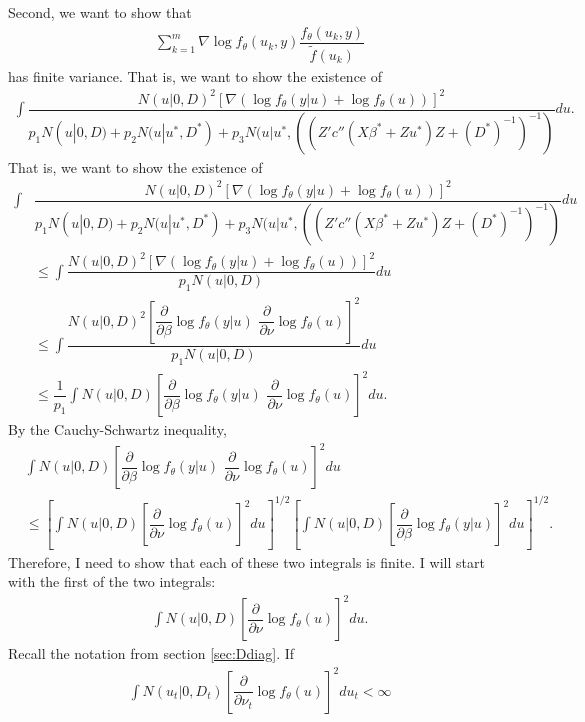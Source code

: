 \documentclass{article}
\begin{document}
Second, we want to show that
\begin{align}
\sum_{k=1}^m \nabla \log f_\theta (u_k,y) \dfrac{f_\theta(u_k,y)}{\tilde{f}(u_k)}
\end{align}
 has finite variance. That is, we want to show the existence of
\begin{align}
\int \dfrac{N(u|0,D)^2 \left[\nabla \left(\log f_\theta(y|u)+\log f_\theta (u) \right) \right]^2}{p_1 N(u|0,D)+p_2 N(u|u^*, D^*) + p_3 N(u|u^*, ((Z'  c''(X \beta^*+Zu^*) Z +(D^*)^{-1}   )^{-1})} du.
\end{align}
That is, we want to show the existence of
\begin{align}
\int &\dfrac{N(u|0,D)^2 \left[\nabla \left(\log f_\theta(y|u)+\log f_\theta (u) \right) \right]^2}{p_1 N(u|0,D)+p_2 N(u|u^*, D^*) + p_3 N(u|u^*, ((Z'  c''(X \beta^*+Zu^*) Z +(D^*)^{-1}   )^{-1})} du \\
&\leq \int  \dfrac{N(u|0,D)^2 \left[\nabla \left(\log f_\theta(y|u) + \log f_\theta (u) \right) \right]^2}{p_1 N(u|0,D)} du  \\
&\leq  \int \dfrac{N(u|0,D)^2 \left[ \dfrac{\partial}{\partial \beta} \log f_\theta(y|u) \, \, \dfrac{\partial}{\partial \nu} \log f_\theta (u)  \right]^2}{p_1 N(u|0,D)} du  \\
&\leq \dfrac{1}{p_1}  \int N(u|0,D) \left[ \dfrac{\partial}{\partial \beta}\log f_\theta(y|u) \, \, \dfrac{\partial}{\partial \nu} \log f_\theta (u)  \right]^2 du.
\end{align}
By the Cauchy-Schwartz inequality, 
\begin{align}
  &\int N(u|0,D) \left[ \dfrac{\partial}{\partial \beta}\log f_\theta(y|u) \, \, \dfrac{\partial}{\partial \nu} \log f_\theta (u)  \right]^2 du \\
& \leq \left[  \int N(u|0,D) \left[  \dfrac{\partial}{\partial \nu} \log f_\theta (u)  \right]^2 du \right]^{1/2}  \left[  \int N(u|0,D) \left[ \dfrac{\partial}{\partial \beta}\log f_\theta(y|u)   \right]^2 du \right]^{1/2} .
\end{align}
Therefore, I need to show that each of these two integrals is finite.  I will start with the first of the two integrals: 
\begin{align}
\int N(u|0,D) \left[  \dfrac{\partial}{\partial \nu} \log f_\theta(u)  \right]^2 du. 
\end{align}
Recall the notation from section \ref{sec:Ddiag}.  If
\begin{align}
\int N(u_t|0,D_t) \left[  \dfrac{\partial}{\partial \nu_t} \log f_\theta(u)  \right]^2 du_t< \infty 
\end{align}
\end{document}
